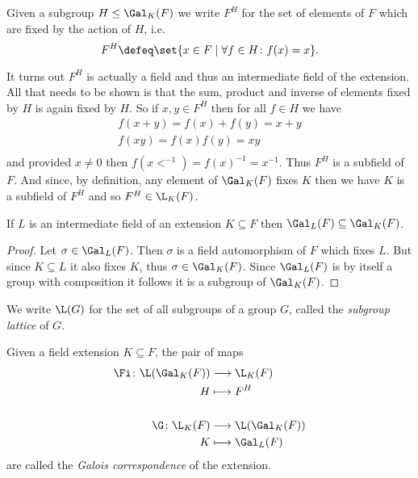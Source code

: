 \documentclass[12pt,oneside]{book}
\begin{document}
\begin{definition}
	Given a subgroup \( H \leq \Gal_K(F) \) we write \( F^H \) for the set of elements of \(
	F \) which are fixed by the action of \( H \), i.e.
	\begin{equation*}
		F^H \defeq \set{x \in F \mid \forall f \in H \colon f(x) = x}.
	\end{equation*}
\end{definition}
It turns out \( F^H \) is actually a field and thus an intermediate field of the
extension. All that needs to be shown is that the sum, product and inverse of elements
fixed by \( H \) is again fixed by \( H \). So if \( x, y \in F^H \) then for all \( f \in
H \) we have
\begin{gather*}
	f(x + y) = f(x) + f(y) = x + y \\
	f(xy) = f(x)f(y) = xy \\
\end{gather*}
and provided \( x \neq 0 \) then \( f(x<^{-1}) = f(x)^{-1} = x^{-1} \). Thus \( F^H \) is
a subfield of \( F \). And since, by definition, any element of \( \Gal_K(F) \) fixes \( K
\) then we have \( K \) is a subfield of \( F^H \) and so \( F^H \in \L_K(F) \).

\begin{lemma}
	If \( L \) is an intermediate field of an extension \( K \subseteq F \) then \(
	\Gal_L(F) \subseteq \Gal_K(F) \).
\end{lemma}
\begin{proof}
	Let \( \sigma \in \Gal_L(F) \). Then \( \sigma \) is a field automorphism of \( F \)
	which fixes \( L \). But since \( K \subseteq L \) it also fixes \( K \), thus \( \sigma
	\in \Gal_K(F) \). Since \( \Gal_L(F) \) is by itself a group with composition it follows
	it is a subgroup of \( \Gal_K(F) \).
\end{proof}

\begin{definition}
	We write \( \L(G) \) for the set of all subgroups of a group \( G \), called the
	\emph{subgroup lattice} of \( G \).
\end{definition}

\begin{definition}
	Given a field extension	\( K \subseteq F \), the pair of maps
	\begin{align*}
		\Fi \colon \L(\Gal_K(F)) & \longrightarrow \L_K(F) \\
		H & \longmapsto F^H \\
		\\
		\G \colon \L_K(F) & \longrightarrow \L(\Gal_K(F)) \\
		K & \longmapsto \Gal_L(F)
	\end{align*}
	are called the \emph{Galois correspondence} of the extension.
\end{definition}
\end{document}

